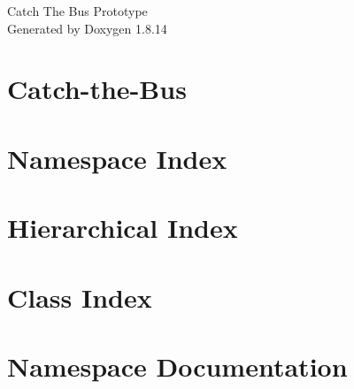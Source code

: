 \documentclass[twoside]{book}
\newcommand{\+}{\discretionary{\mbox{\scriptsize$\hookleftarrow$}}{}{}}
\newcommand{\clearemptydoublepage}{%
  \newpage{\pagestyle{empty}\cleardoublepage}%
}
\begin{document}
\hypersetup{pageanchor=false,
             bookmarksnumbered=true,
             pdfencoding=unicode
            }
\begin{titlepage}
\vspace*{7cm}
\begin{center}%
{\Large Catch The Bus Prototype }\\
\vspace*{1cm}
{\large Generated by Doxygen 1.8.14}\\
\end{center}
\end{titlepage}
\clearemptydoublepage
{}
\tableofcontents
\clearemptydoublepage
{}
\hypersetup{pageanchor=true}

\chapter{Catch-\/the-\/\+Bus}
\label{md__d_1__users__bennett__desktop__school__e_e_c_s_448__catch-the-_bus__r_e_a_d_m_e}

\chapter{Namespace Index}

\chapter{Hierarchical Index}

\chapter{Class Index}

\chapter{Namespace Documentation}




















\end{document}
